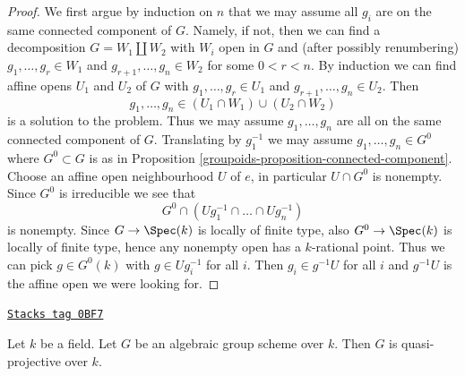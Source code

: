 \begin{proof}

We first argue by induction on $n$ that we may assume all $g_i$ are
on the same connected component of $G$. Namely, if not, then we can
find a decomposition $G = W_1 \amalg W_2$ with $W_i$ open in $G$ and
(after possibly renumbering) $g_1, \ldots, g_r \in W_1$ and
$g_{r + 1}, \ldots, g_n \in W_2$ for some $0 < r < n$. By
induction we can find affine opens $U_1$ and $U_2$ of $G$ with
$g_1, \ldots, g_r \in U_1$ and $g_{r + 1}, \ldots, g_n \in U_2$.
Then
$$
g_1, \ldots, g_n \in (U_1 \cap W_1) \cup (U_2 \cap W_2)
$$
is a solution to the problem. Thus we may assume $g_1, \ldots, g_n$
are all on the same connected component of $G$. Translating by $g_1^{-1}$
we may assume $g_1, \ldots, g_n \in G^0$ where $G^0 \subset G$ is as in
Proposition \ref{groupoids-proposition-connected-component}. Choose an affine
open neighbourhood $U$ of $e$, in particular $U \cap G^0$ is nonempty.
Since $G^0$ is irreducible we see that
$$
G^0 \cap (Ug_1^{-1} \cap \ldots \cap Ug_n^{-1})
$$
is nonempty. Since $G \to \Spec(k)$ is locally of finite type, also
$G^0 \to \Spec(k)$ is locally of finite type, hence any nonempty
open has a $k$-rational point. Thus we can pick $g \in G^0(k)$ with
$g \in Ug_i^{-1}$ for all $i$. Then $g_i \in g^{-1}U$ for all $i$
and $g^{-1}U$ is the affine open we were looking for.
\end{proof}

\begin{lemma}
\label{groupoids-lemma-algebraic-quasi-projective}
\href{https://stacks.math.columbia.edu/tag/0BF7}{\texttt{Stacks tag 0BF7}}

Let $k$ be a field. Let $G$ be an algebraic group scheme over $k$.
Then $G$ is quasi-projective over $k$.
\end{lemma}

